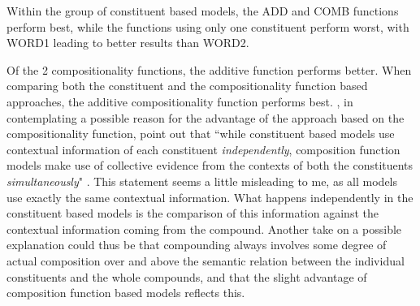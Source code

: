 \pagebreak[4] 
Within the group of
constituent based models, the ADD and COMB functions perform best,
while the functions using only one constituent perform worst, with
WORD1 leading to better results than WORD2. 

Of the 2 compositionality functions, the additive function performs
better. When comparing both the constituent and the compositionality
function based approaches, the additive compositionality function
performs best. \citeauthor{Reddyetal:2011}, in contemplating a possible reason for the advantage of the approach based on the compositionality function, point out that
``while
  constituent based models use contextual information of each
  constituent \emph{independently}, composition function models make
  use of collective evidence from the contexts of both the
  constituents \emph{simultaneously}"
  \citep[217]{Reddyetal:2011}. This statement seems a little
  misleading to me, as all models use exactly the same contextual
  information. What happens independently in the constituent based
  models is the comparison of this information against the contextual
  information coming from the compound. Another take on a possible
  explanation could thus be that compounding always involves some
  degree of actual composition over and above the semantic relation
  between the individual constituents and the whole compounds, and
  that the slight advantage of composition function based models
  reflects this.
  


